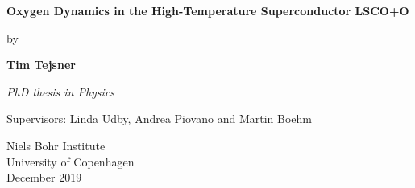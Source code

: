 \begin{titlingpage}
    \begin{center}
        \vspace*{1cm}
  
        {\large \textbf{Oxygen Dynamics in the High-Temperature Superconductor LSCO+O}}
  
        \vspace{0.6cm}

        by

        \vspace{0.6cm}
  
        \textbf{Tim Tejsner}

        \vspace{2cm}
  
        \textit{PhD thesis in Physics}
        
        \vfill

        Supervisors: Linda Udby, Andrea Piovano and Martin Boehm
  
        \vspace{1cm}
    
        Niels Bohr Institute\\
        University of Copenhagen\\
        December 2019 
    \end{center}
 \end{titlingpage}